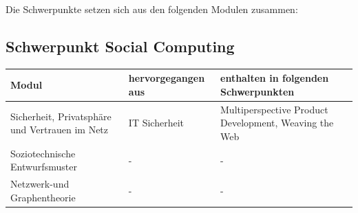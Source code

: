 Die Schwerpunkte setzen sich aus den folgenden Modulen zusammen:

\subsection{Schwerpunkt Social
Computing}\label{schwerpunkt-social-computing}

\begin{longtable}[]{@{}lll@{}}
\toprule
\begin{minipage}[b]{0.33\columnwidth}\raggedright\strut
Modul\strut
\end{minipage} & \begin{minipage}[b]{0.33\columnwidth}\raggedright\strut
hervorgegangen aus\strut
\end{minipage} & \begin{minipage}[b]{0.33\columnwidth}\raggedright\strut
enthalten in folgenden Schwerpunkten\strut
\end{minipage}\tabularnewline
\midrule
\endhead
\begin{minipage}[t]{0.33\columnwidth}\raggedright\strut
Sicherheit, Privatsphäre und Vertrauen im Netz\strut
\end{minipage} & \begin{minipage}[t]{0.33\columnwidth}\raggedright\strut
IT Sicherheit\strut
\end{minipage} & \begin{minipage}[t]{0.33\columnwidth}\raggedright\strut
Multiperspective Product Development, Weaving the Web\strut
\end{minipage}\tabularnewline
\begin{minipage}[t]{0.33\columnwidth}\raggedright\strut
Soziotechnische Entwurfsmuster\strut
\end{minipage} & \begin{minipage}[t]{0.33\columnwidth}\raggedright\strut
-\strut
\end{minipage} & \begin{minipage}[t]{0.33\columnwidth}\raggedright\strut
-\strut
\end{minipage}\tabularnewline
\begin{minipage}[t]{0.33\columnwidth}\raggedright\strut
Netzwerk-und Graphentheorie\strut
\end{minipage} & \begin{minipage}[t]{0.33\columnwidth}\raggedright\strut
-\strut
\end{minipage} & \begin{minipage}[t]{0.33\columnwidth}\raggedright\strut
-\strut
\end{minipage}\tabularnewline
\bottomrule
\end{longtable}

